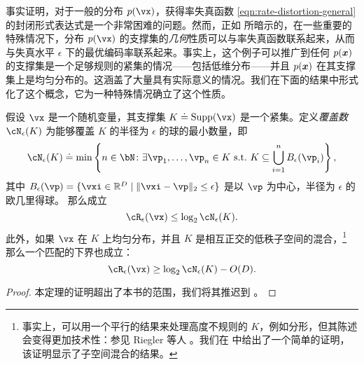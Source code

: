 \documentclass[../../book-main_zh.tex]{subfiles}
\begin{document}
事实证明，对于一般的分布 $p(\vx)$，获得率失真函数 \eqref{eqn:rate-distortion-general} 的封闭形式表达式是一个非常困难的问题。然而，正如  所暗示的，在一些重要的特殊情况下，分布 $p(\vx)$ 的支撑集的\textit{几何}性质可以与率失真函数联系起来，从而与失真水平 $\epsilon$ 下的最优编码率联系起来。事实上，这个例子可以推广到任何 $p(\bm{x})$ 的支撑集是一个足够规则的紧集的情况——包括低维分布——并且 $p(\bm{x})$ 在其支撑集上是均匀分布的。这涵盖了大量具有实际意义的情况。我们在下面的结果中形式化了这个概念，它为一种特殊情况确立了这个性质。


%

\begin{theorem}\label{thm:covering-number-rate-distortion}
	假设 \(\vx\) 是一个随机变量，其支撑集 \(K \doteq \Supp(\vx)\) 是一个紧集。定义\textit{覆盖数} \(\cN_{\epsilon}(K)\) 为能够覆盖 \(K\) 的半径为 \(\epsilon\) 的球的最小数量，即
	\begin{equation}
		\cN_{\epsilon}(K) \doteq \min\left\{n \in \bN \colon \exists \vp_{1}, \dots, \vp_{n} \in K\ \text{s.t.}\ K \subseteq \bigcup_{i = 1}^{n}B_{\epsilon}(\vp_{i})\right\},
	\end{equation}
	其中 \(B_{\epsilon}(\vp) = \set{\vxi\in \R^D \given \norm{\vxi - \vp}_2 \leq
	\epsilon}\) 是以 \(\vp\) 为中心，半径为 \(\epsilon\) 的欧几里得球。
	那么成立
	\begin{equation}
		\cR_{\epsilon}(\vx) 
		\leq \log_{2} \cN_{\epsilon}(K).
	\end{equation}
	此外，如果 \(\vx\) 在 \(K\) 上均匀分布，并且 \(K\) 是相互正交的低秩子空间的混合，\footnote{事实上，可以用一个平行的结果来处理高度不规则的 \(K\)，例如分形，但其陈述会变得更加技术性：参见 Riegler 等人 \cite{Riegler2018-jh,Riegler2023-rr}。我们在  中给出了一个简单的证明，该证明显示了子空间混合的结果。}
	那么一个匹配的下界也成立：
	\begin{equation}
		\cR_{\epsilon}(\vx)
		\geq
		\log_{2} \cN_{\epsilon}(K) - O(D).
	\end{equation}
\end{theorem}
\begin{proof}
本定理的证明超出了本书的范围，我们将其推迟到 。
\end{proof}
\end{document}
